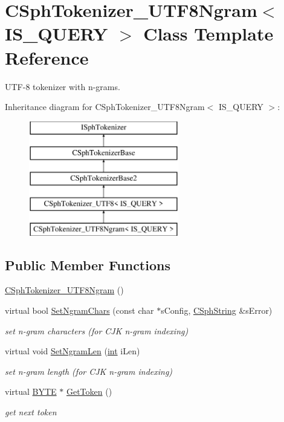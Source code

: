 \hypertarget{classCSphTokenizer__UTF8Ngram}{\section{C\-Sph\-Tokenizer\-\_\-\-U\-T\-F8\-Ngram$<$ I\-S\-\_\-\-Q\-U\-E\-R\-Y $>$ Class Template Reference}
\label{classCSphTokenizer__UTF8Ngram}
}


U\-T\-F-\/8 tokenizer with n-\/grams.  


Inheritance diagram for C\-Sph\-Tokenizer\-\_\-\-U\-T\-F8\-Ngram$<$ I\-S\-\_\-\-Q\-U\-E\-R\-Y $>$\-:\begin{figure}[H]
\begin{center}
\leavevmode
\includegraphics[height=5.000000cm]{classCSphTokenizer__UTF8Ngram}
\end{center}
\end{figure}
\subsection*{Public Member Functions}
\begin{DoxyCompactItemize}
\item 
\hyperlink{classCSphTokenizer__UTF8Ngram_a684d58df3dbca1295371376ba9a0fbe0}{C\-Sph\-Tokenizer\-\_\-\-U\-T\-F8\-Ngram} ()
\item 
virtual bool \hyperlink{classCSphTokenizer__UTF8Ngram_aadeade8ccc41cdeacabea59c3e43d0e7}{Set\-Ngram\-Chars} (const char $\ast$s\-Config, \hyperlink{structCSphString}{C\-Sph\-String} \&s\-Error)
\begin{DoxyCompactList}\small\item\em set n-\/gram characters (for C\-J\-K n-\/gram indexing) \end{DoxyCompactList}\item 
virtual void \hyperlink{classCSphTokenizer__UTF8Ngram_a1464d11c6304389f6d3b4e81ff4de758}{Set\-Ngram\-Len} (\hyperlink{sphinxexpr_8cpp_a4a26e8f9cb8b736e0c4cbf4d16de985e}{int} i\-Len)
\begin{DoxyCompactList}\small\item\em set n-\/gram length (for C\-J\-K n-\/gram indexing) \end{DoxyCompactList}\item 
virtual \hyperlink{sphinxstd_8h_a4ae1dab0fb4b072a66584546209e7d58}{B\-Y\-T\-E} $\ast$ \hyperlink{classCSphTokenizer__UTF8Ngram_aeb92c04c9857c30431c5d000ac682e27}{Get\-Token} ()
\begin{DoxyCompactList}\small\item\em get next token \end{DoxyCompactList}\end{DoxyCompactItemize}
